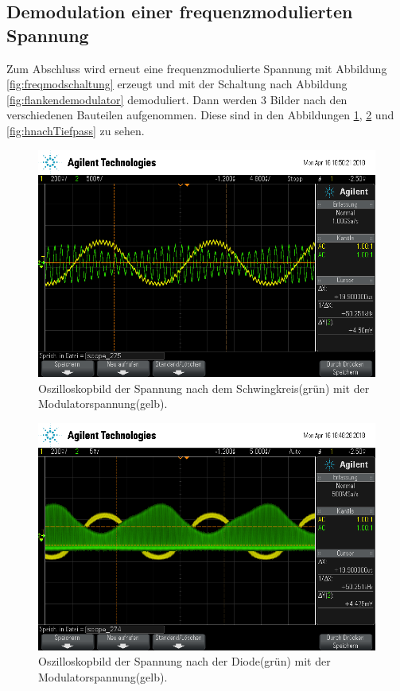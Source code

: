 \subsection{Demodulation einer frequenzmodulierten Spannung}

Zum Abschluss wird erneut eine frequenzmodulierte Spannung mit Abbildung \ref{fig:freqmodschaltung} erzeugt und mit der Schaltung nach Abbildung \ref{fig:flankendemodulator} demoduliert. Dann werden 3 Bilder nach den verschiedenen Bauteilen aufgenommen.
Diese sind in den Abbildungen \ref{fig:hnachSchwingkreis}, \ref{fig:hnachDiode} und \ref{fig:hnachTiefpass} zu sehen.
\begin{figure}[h]
  \centering
  \includegraphics[width=.9\textwidth]{Oszi_Pics/hnachSchwingkreis.png}
  \caption{Oszilloskopbild der Spannung nach dem Schwingkreis(grün) mit der Modulatorspannung(gelb).}
  \label{fig:hnachSchwingkreis}
\end{figure}
\begin{figure}[h]
  \centering
  \includegraphics[width=.9\textwidth]{Oszi_Pics/hnachDiode?.png}
  \caption{Oszilloskopbild der Spannung nach der Diode(grün) mit der Modulatorspannung(gelb).}
  \label{fig:hnachDiode}
\end{figure}
